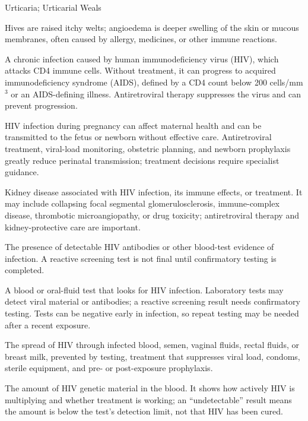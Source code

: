 \synonyms
Urticaria; Urticarial Weals

 Hives are raised itchy welts; angioedema is deeper swelling of the skin or mucous membranes, often caused by allergy, medicines, or other immune reactions.

 A chronic infection caused by human immunodeficiency virus (HIV), which attacks CD4 immune cells. Without treatment, it can progress to acquired immunodeficiency syndrome (AIDS), defined by a CD4 count below 200 cells/mm$^3$ or an AIDS-defining illness. Antiretroviral therapy suppresses the virus and can prevent progression.

 HIV infection during pregnancy can affect maternal health and can be transmitted to the fetus or newborn without effective care. Antiretroviral treatment, viral-load monitoring, obstetric planning, and newborn prophylaxis greatly reduce perinatal transmission; treatment decisions require specialist guidance.

 Kidney disease associated with HIV infection, its immune effects, or treatment. It may include collapsing focal segmental glomerulosclerosis, immune-complex disease, thrombotic microangiopathy, or drug toxicity; antiretroviral therapy and kidney-protective care are important.

 The presence of detectable HIV antibodies or other blood-test evidence of infection. A reactive screening test is not final until confirmatory testing is completed.

 A blood or oral-fluid test that looks for HIV infection. Laboratory tests may detect viral material or antibodies; a reactive screening result needs confirmatory testing. Tests can be negative early in infection, so repeat testing may be needed after a recent exposure.

 The spread of HIV through infected blood, semen, vaginal fluids, rectal fluids, or breast milk, prevented by testing, treatment that suppresses viral load, condoms, sterile equipment, and pre- or post-exposure prophylaxis.

 The amount of HIV genetic material in the blood. It shows how actively HIV is multiplying and whether treatment is working; an “undetectable” result means the amount is below the test’s detection limit, not that HIV has been cured.

